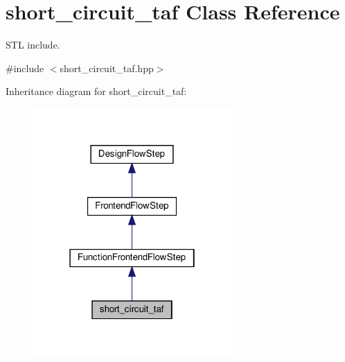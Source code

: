 \hypertarget{classshort__circuit__taf}{}\section{short\+\_\+circuit\+\_\+taf Class Reference}
\label{classshort__circuit__taf}


S\+TL include.  




{\ttfamily \#include $<$short\+\_\+circuit\+\_\+taf.\+hpp$>$}



Inheritance diagram for short\+\_\+circuit\+\_\+taf\+:
\nopagebreak
\begin{figure}[H]
\begin{center}
\leavevmode
\includegraphics[width=214pt]{d9/dff/classshort__circuit__taf__inherit__graph}
\end{center}
\end{figure}


